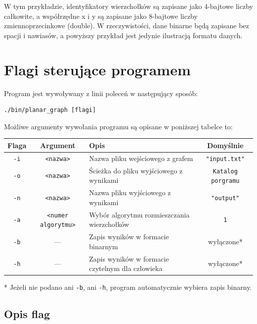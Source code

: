 \documentclass[12pt]{article}
\begin{document}
W tym przykładzie, identyfikatory wierzchołków są zapisane jako 4-bajtowe
liczby całkowite, a współrzędne x i y są zapisane jako 8-bajtowe liczby
zmiennoprzecinkowe (double). W rzeczywistości, dane binarne będą zapisane bez
spacji i nawiasów, a powyższy przykład jest jedynie ilustracją formatu danych.

\section{Flagi sterujące programem}

Program jest wywoływany z linii poleceń w następujący sposób:

\begin{verbatim}
./bin/planar_graph [flagi]
\end{verbatim}
Możliwe argumenty wywołania programu są opisane w poniższej tabelce to:

\begin{center}
	\begin{tabular}{|c|c|p{7cm}|c|}
		\hline
		\textbf{Flaga} & \textbf{Argument}          & \textbf{Opis}                                    & \textbf{Domyślnie}        \\
		\hline
		\texttt{-i}    & \texttt{<nazwa>}           & Nazwa pliku wejściowego z grafem                 & \texttt{"input.txt"}      \\
		\hline
		\texttt{-o}    & \texttt{<nazwa>}           & Ścieżka do pliku wyjściowego z wynikami          & \texttt{Katalog porgramu} \\
		\hline
		\texttt{-n}    & \texttt{<nazwa>}           & Nazwa pliku wyjściowego z wynikami               & \texttt{"output"}         \\
		\hline
		\texttt{-a}    & \texttt{<numer algorytmu>} & Wybór algorytmu rozmieszczania wierzchołków      & \texttt{1}                \\
		\hline
		\texttt{-b}    & —                          & Zapis wyników w formacie binarnym                & wyłączone*                \\
		\hline
		\texttt{-h}    & —                          & Zapis wyników w formacie czytelnym dla człowieka & wyłączone*                \\
		\hline
	\end{tabular}
\end{center}
* Jeżeli nie podano ani \texttt{-b}, ani \texttt{-h}, program automatycznie wybiera zapis binarny.

\subsection{Opis flag}
\end{document}
